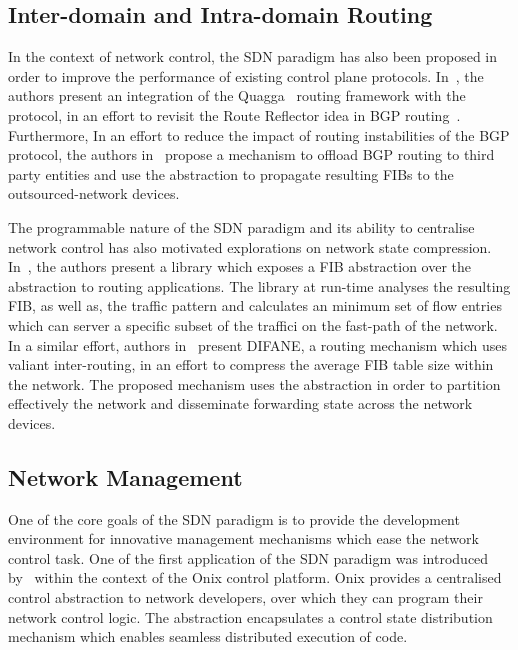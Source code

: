 \subsection{Inter-domain and Intra-domain Routing}

In the context of network control, the SDN paradigm has also been proposed in
order to improve the performance of existing control plane protocols.
In~\cite{Rothenberg12}, the authors present an integration of the
Quagga~\cite{quagga} routing framework with the \of protocol, in an effort to
revisit the Route Reflector idea in BGP routing~\cite{RFC4456}. Furthermore, In
an effort to reduce the impact of routing instabilities of the BGP protocol, the
authors in~\cite{Kotronis12} propose a mechanism to offload BGP routing to third
party entities and use the \of abstraction to propagate resulting FIBs to the 
outsourced-network devices.

The programmable nature of the SDN paradigm and its ability to centralise
network control has also motivated explorations on network state compression.
In~\cite{Sarrar12}, the authors present a library which exposes a FIB
abstraction over the \of abstraction to routing applications.  The library at
run-time analyses the resulting FIB, as well as, the traffic pattern and
calculates an minimum set of flow entries which can server a specific subset of
the traffici on the fast-path of the network.  In a similar effort, authors
in~\cite{Yu10} present DIFANE, a routing mechanism which uses valiant
inter-routing, in an effort to compress the average FIB table size within the
network. The proposed mechanism uses the \of abstraction in order to partition
effectively the network and disseminate forwarding state across the network
devices. 

\subsection{Network Management}

One of the core goals of the SDN paradigm is to provide the development
environment for innovative management mechanisms which ease the network control
task. One of the first application of the SDN paradigm was introduced
by~\cite{Koponen10} within the context of the Onix control platform. Onix
provides a centralised control abstraction to network developers, over which
they can program their network control logic. The abstraction encapsulates a
control state distribution mechanism which enables seamless distributed
execution of code. 

